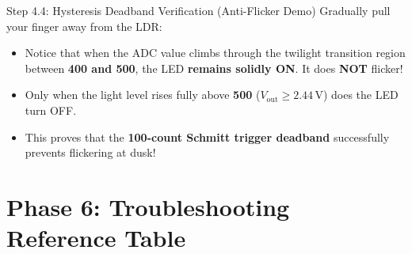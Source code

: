\documentclass[12pt,a4paper]{article}
\begin{document}
\newpage

\begin{stepbox}{Step 4.4: Hysteresis Deadband Verification (Anti-Flicker Demo)}
Gradually pull your finger away from the LDR:
\begin{itemize}
    \item Notice that when the ADC value climbs through the twilight transition region between \textbf{400 and 500}, the LED \textbf{remains solidly ON}. It does \textbf{NOT} flicker!
    \item Only when the light level rises fully above \textbf{500} ($V_{\text{out}} \ge 2.44\,\text{V}$) does the LED turn OFF.
    \item This proves that the \textbf{100-count Schmitt trigger deadband} successfully prevents flickering at dusk!
\end{itemize}
\end{stepbox}

\vspace{0.1cm}

\section*{Phase 6: Troubleshooting Reference Table}
\end{document}
